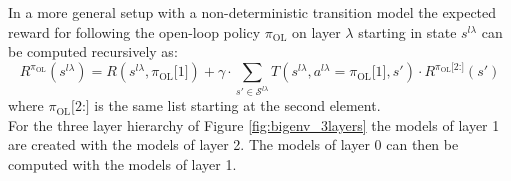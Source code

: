 In a more general setup with a non-deterministic transition model the expected reward for following the open-loop policy $\pi_\text{OL}$ on layer $\lambda$ starting in state $s^{l\lambda}$ can be computed recursively as:
\begin{equation}\label{eq:R_OL}
    R^{\pi_\text{OL}}\left( s^{l\lambda} \right) = R\left(s^{l\lambda}, \pi_\text{OL}\texttt{[$1$]}\right) + \gamma \cdot \sum_{s'\in \mathcal{S}^{l\lambda}}T\left( s^{l\lambda}, a^{l\lambda}=\pi_\text{OL}\texttt{[$1$]}, s' \right)\cdot R^{\pi_\text{OL}\texttt{[$2$:]}}\left( s' \right)
\end{equation}
where $\pi_\text{OL}\texttt{[$2$:]}$ is the same list starting at the second element.\\
For the three layer hierarchy of Figure \ref{fig:bigenv_3layers} the models of layer 1 are created with the models of layer 2. The models of layer 0 can then be computed with the models of layer 1.\\

